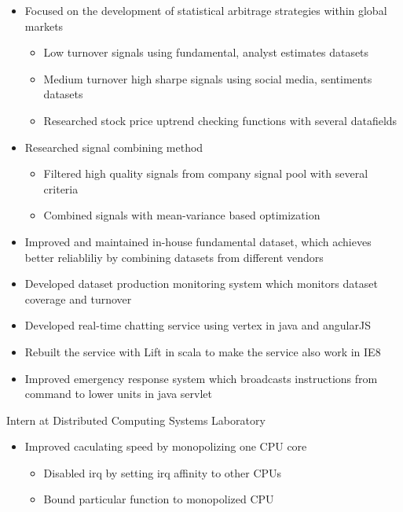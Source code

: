 \documentclass[11pt,a4paper,sans]{moderncv}        %
\begin{document}
{\begin{itemize}%
    \item Focused on the development of statistical arbitrage strategies within global markets
        \begin{itemize}%
            \item Low turnover signals using fundamental, analyst estimates datasets
            \item Medium turnover high sharpe signals using social media, sentiments datasets
            \item Researched stock price uptrend checking functions with several datafields
        \end{itemize}
    \item Researched signal combining method
        \begin{itemize}%
            \item Filtered high quality signals from company signal pool with several criteria
            \item Combined signals with mean-variance based optimization
        \end{itemize}
\end{itemize}}

{\begin{itemize}%
    \item Improved and maintained in-house fundamental dataset, which achieves better reliabliliy by combining datasets from different vendors
    \item Developed dataset production monitoring system which monitors dataset coverage and turnover
\end{itemize}}

{\begin{itemize}%
    \item Developed real-time chatting service using vertex in java and angularJS
    \item Rebuilt the service with Lift in scala to make the service also work in IE8
    \item Improved emergency response system which broadcasts instructions from command to lower units in java servlet
\end{itemize}}

{Intern at Distributed Computing Systems Laboratory
  \begin{itemize}%
    \item Improved caculating speed by monopolizing one CPU core
      \begin{itemize}
        \item Disabled irq by setting irq affinity to other CPUs
        \item Bound particular function to monopolized CPU
      \end{itemize}
\end{itemize}}
\end{document}
